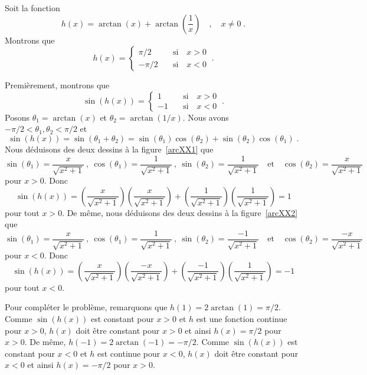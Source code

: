 {\begin{egg}[\theory]
Soit la fonction
\[
h(x) = \arctan(x) + \arctan\left(\frac{1}{x}\right) \quad , \quad
x\neq 0 \; .
\]
Montrons que
\[
h(x) = \begin{cases}
\pi/2 & \quad \text{si} \quad x>0 \\
-\pi/2 & \quad \text{si} \quad x<0
\end{cases} \ .
\]

Premièrement, montrons que
\[
\sin(h(x)) = \begin{cases}
1 & \quad \text{si} \quad x>0 \\
-1 & \quad \text{si} \quad x<0
\end{cases} \ .
\]
Posons $\theta_1 = \arctan(x)$ et $\theta_2 = \arctan(1/x)$.  Nous avons 
$-\pi/2 < \theta_1, \theta_2 < \pi/2$ et
\[
\sin(h(x)) = \sin(\theta_1+\theta_2) = \sin(\theta_1)\cos(\theta_2)
+ \sin(\theta_2)\cos(\theta_1) \; .
\]
Nous déduisons des deux dessins à la figure~\ref{arcXX1} que
\[
\sin(\theta_1) = \frac{x}{\sqrt{x^2+1}} \ ,
\ \cos(\theta_1) = \frac{1}{\sqrt{x^2+1}} \ ,
\ \sin(\theta_2) = \frac{1}{\sqrt{x^2+1}}
\quad \text{et} \quad
\cos(\theta_2) = \frac{x}{\sqrt{x^2+1}}
\]
pour $x>0$.  Donc
\[
\sin(h(x)) = \left(\frac{x}{\sqrt{x^2+1}}\right)
\left(\frac{x}{\sqrt{x^2+1}}\right)
+ \left(\frac{1}{\sqrt{x^2+1}}\right) \left(\frac{1}{\sqrt{x^2+1}}\right) = 1
\]
pour tout $x>0$.
De même, nous déduisons des deux dessins à la figure~\ref{arcXX2} que
\[
\sin(\theta_1) = \frac{x}{\sqrt{x^2+1}} \ ,
\ \cos(\theta_1) = \frac{1}{\sqrt{x^2+1}} \ ,
\ \sin(\theta_2) = \frac{-1}{\sqrt{x^2+1}}
\quad\text{et}\quad
\cos(\theta_2) = \frac{-x}{\sqrt{x^2+1}}
\]
pour $x<0$.  Donc
\[
\sin(h(x)) = \left(\frac{x}{\sqrt{x^2+1}}\right)
\left(\frac{-x}{\sqrt{x^2+1}}\right)
+ \left(\frac{-1}{\sqrt{x^2+1}}\right) \left(\frac{1}{\sqrt{x^2+1}}\right) = -1
\]
pour tout $x<0$.

Pour compléter le problème, remarquons que
$h(1) = 2\arctan(1) = \pi/2$.  Comme $\sin(h(x))$ est constant pour
$x>0$ et $h$ est une fonction continue pour $x>0$, $h(x)$ doit être
constant pour $x>0$ et ainsi $h(x) = \pi/2$ pour $x>0$.  De même,
$h(-1) = 2\arctan(-1) = -\pi/2$.  Comme $\sin(h(x))$ est constant pour
$x<0$ et $h$ est continue pour $x<0$, $h(x)$ doit être constant pour
$x<0$ et ainsi $h(x) = -\pi/2$ pour $x>0$.
\end{egg}


}

